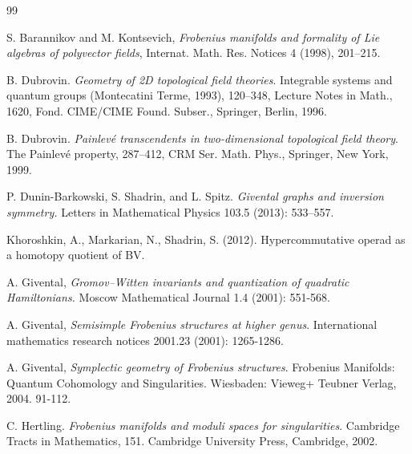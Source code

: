 \documentclass[12pt,a4paper]{amsart}
\newcommand{\<}{\left<}
\renewcommand{\>}{\right>}
\numberwithin{equation}{section}
\begin{document}

\begin{thebibliography}{99}



S. Barannikov and M. Kontsevich, {\it Frobenius manifolds and formality of Lie algebras of polyvector fields}, Internat. Math.
Res. Notices 4 (1998), 201--215.


B. Dubrovin. {\it Geometry of 2D topological field theories}. Integrable systems and quantum groups (Montecatini Terme, 1993), 120--348, Lecture Notes in Math., 1620, Fond. CIME/CIME Found. Subser., Springer, Berlin, 1996. 

B. Dubrovin. {\it Painlev\'e transcendents in two-dimensional topological field theory}. The Painlev\'e property, 287--412, CRM Ser. Math. Phys., Springer, New York, 1999.

P. Dunin-Barkowski, S. Shadrin, and L. Spitz. {\it Givental graphs and inversion symmetry.} Letters in Mathematical Physics 103.5 (2013): 533--557.

Khoroshkin, A., Markarian, N., Shadrin, S. (2012). 
Hypercommutative operad as a homotopy quotient of BV.

    A. Givental, {\it Gromov--Witten invariants and quantization of quadratic Hamiltonians.}
    Moscow Mathematical Journal 1.4 (2001): 551-568.

    A. Givental, {\it Semisimple Frobenius structures at higher genus}.
    International mathematics research notices 2001.23 (2001): 1265-1286.

    A. Givental, { \it Symplectic geometry of Frobenius structures}.
    Frobenius Manifolds: Quantum Cohomology and Singularities. Wiesbaden: Vieweg+ Teubner Verlag, 2004. 91-112.

C. Hertling. {\it Frobenius manifolds and moduli spaces for singularities}. Cambridge Tracts in Mathematics, 151. Cambridge University Press, Cambridge, 2002.


\end{thebibliography}
\end{document}
